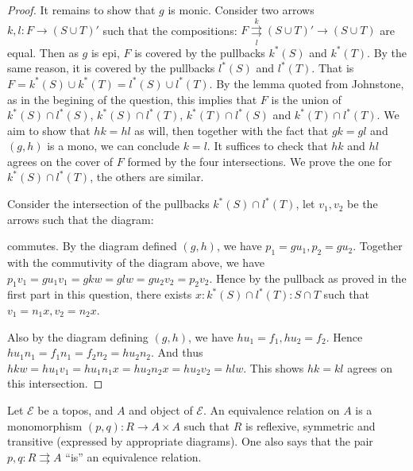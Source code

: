 \documentclass[a4paper]{article}
\begin{document}
\begin{proof}
    It remains to show that $g$ is monic. Consider two arrows $k,l:F\to (S\cup T)'$ such that the compositions: $F\overset{k}{\underset{l}{\rightrightarrows}} (S\cup T)'\to (S\cup T)$ are equal. Then as $g$ is epi, $F$ is covered by the pullbacks $k^*(S)$ and $k^*(T)$. By the same reason, it is covered by the pullbacks $l^*(S)$ and $l^*(T)$. That is $F=k^*(S)\cup k^*(T)=l^*(S)\cup l^*(T)$. By the lemma quoted from Johnstone, as in the begining of the question, this implies that $F$ is the union of $k^*(S)\cap l^*(S)$, $k^*(S)\cap l^*(T)$, $k^*(T)\cap l^*(S)$ and $k^*(T)\cap l^*(T)$. We aim to show that $hk=hl$ as will, then together with the fact that $gk = gl$ and $(g,h)$ is a mono, we can conclude $k=l$. It suffices to check that $hk$ and $hl$ agrees on the cover of $F$ formed by the four intersections. We prove the one for $k^*(S)\cap l^*(T)$, the others are similar.

    Consider the intersection of the pullbacks $k^*(S)\cap l^*(T)$, let $v_1,v_2$ be the arrows such that the diagram:
    
    \begin{center}
    \end{center}

    commutes. By the diagram defined $(g,h)$, we have $p_1 = gu_1,p_2=gu_2$. Together with the commutivity of the diagram above, we have $p_1v_1=gu_1v_1=gkw=glw=gu_2v_2=p_2v_2$. Hence by the pullback as proved in the first part in this question, there exists $x:k^*(S)\cap l^*(T):S\cap T$ such that $v_1 = n_1x,v_2 = n_2x$.

    Also by the diagram defining $(g,h)$, we have $hu_1 = f_1,hu_2=f_2$. Hence $hu_1n_1=f_1n_1=f_2n_2=hu_2n_2$. And thus $hkw=hu_1v_1=hu_1n_1x=hu_2n_2x=hu_2v_2=hlw$. This shows $hk=kl$ agrees on this intersection.
    



    





\end{proof}

\begin{question}
    Let $\mathcal E$ be a topos, and $A$ and object of $\mathcal E$. An equivalence relation on $A$ is a monomorphism $(p,q):R\to A\times A$ such that $R$ is reflexive, symmetric and transitive (expressed by appropriate diagrams). One also says that the pair $p,q:R\rightrightarrows A$ ``is'' an equivalence relation.
\end{question}
\end{document}

